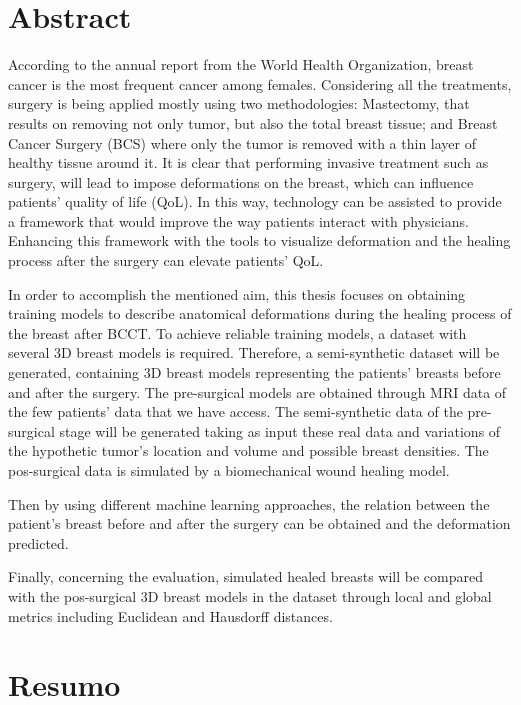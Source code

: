 \chapter*{Abstract}

According to the annual report from the World Health Organization, breast cancer is the most frequent cancer among females. Considering all the treatments, surgery is being applied mostly using two methodologies: Mastectomy, that results on removing not only tumor, but also the total breast tissue; and Breast Cancer Surgery (BCS) where only the tumor is removed with a thin layer of healthy tissue around it. It is clear that performing invasive treatment such as surgery, will lead to impose deformations on the breast, which can influence patients’ quality of life (QoL). In this way, technology can be assisted to provide a framework that would improve the way patients interact with physicians. Enhancing this framework with the tools to visualize deformation and the healing process after the surgery can elevate patients’ QoL.

In order to accomplish the mentioned aim, this thesis focuses on obtaining training models to describe anatomical deformations during the healing process of the breast after BCCT. To achieve reliable training models, a dataset with several 3D breast models is required. Therefore, a semi-synthetic dataset will be generated, containing 3D breast models representing the patients’ breasts before and after the surgery. The pre-surgical models are obtained through MRI data of the few patients’ data that we have access.  The semi-synthetic data of the pre-surgical stage will be generated taking as input these real data and variations of the hypothetic tumor’s location and volume and possible breast densities. The pos-surgical data is simulated by a biomechanical wound healing model. 

Then by using different machine learning approaches, the relation between the patient’s breast before and after the surgery can be obtained and the deformation predicted.

Finally, concerning the evaluation, simulated healed breasts will be compared with the pos-surgical 3D breast models in the dataset through local and global metrics including Euclidean and Hausdorff distances.


\chapter*{Resumo}

